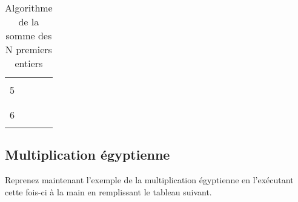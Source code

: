 \documentclass[11pt,a4paper]{article}
\begin{document}
\begin{table}[h!]
\begin{minipage}{0.4\textwidth}
\begin{tabular}{|C{1cm}|C{1cm}|C{1cm}|}
        \hline
             &    &       \\
        5    &    &       \\
             &    &       \\
        \hline
             &    &       \\
        6    &    &       \\
             &    &       \\
        \hline
    \end{tabular}
  \end{minipage}
  \caption{Algorithme de la somme des N premiers entiers}
  \label{somme-n-premiers-entiers}
\end{table}


\vfillLast

\clearpage


\subsection{Multiplication égyptienne}

\bigskip

Reprenez maintenant l'exemple de la multiplication égyptienne en l'exécutant cette fois-ci à la main en remplissant le tableau suivant.



\vfillFirst
\end{document}
